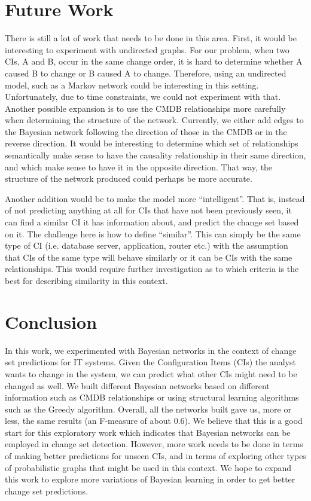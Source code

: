 \documentclass[10pt,twocolumn,letterpaper]{article}
\begin{document}
\section{Future Work}
\label{sec:future}

There is still a lot of work that needs to be done in this area. First, it would be interesting to experiment with undirected graphs. For our problem, when two
CIs,
A and B, occur in the same change order, it is hard to determine whether A caused B to change or B caused A to change. Therefore, using an undirected model,
such as a Markov network could be interesting in this setting. Unfortunately, due to time constraints, we could not experiment with that. Another possible
expansion is to use the CMDB relationships more carefully when determining the structure of the network. Currently, we either add edges to the Bayesian network
following the direction of those in the CMDB or in the reverse direction. It would be interesting to determine which set of relationships semantically make
sense to have the causality relationship in their same direction, and which make sense to have it in the opposite direction. That way, the structure of the
network produced could perhaps be more accurate.

Another addition would be to make the model more ``intelligent''. That is, instead of not predicting anything at all for CIs that have not been previously
seen, it can find a similar CI it has information about, and predict the change set based on it. The challenge here is how to define ``similar''. This can
simply be the same type of CI (i.e. database server, application, router etc.) with the assumption that CIs of the same type will behave similarly or it can be
CIs with the same relationships. This would require further investigation as to which criteria is the best for describing similarity in this context.

\section{Conclusion}
\label{sec:concl}

In this work, we experimented with Bayesian networks in the context of change set predictions for IT systems. Given the Configuration Items (CIs) the analyst
wants to change in the system, we can predict what other CIs might need to be changed as well. We built different Bayesian networks based on different
information such as CMDB relationships or using structural learning algorithms such as the Greedy algorithm. Overall, all the networks built gave us, more or
less, the same results (an F-measure of about 0.6). We believe that this is a good start for this exploratory work which indicates that Bayesian networks can be
employed in change set
detection. However, more work needs to be done in terms of making better predictions for unseen CIs, and in terms of exploring other types of probabilistic
graphs that might be used in this context. We hope to expand this work to explore more variations of Bayesian learning in order to get better change set
predictions.




\end{document}

